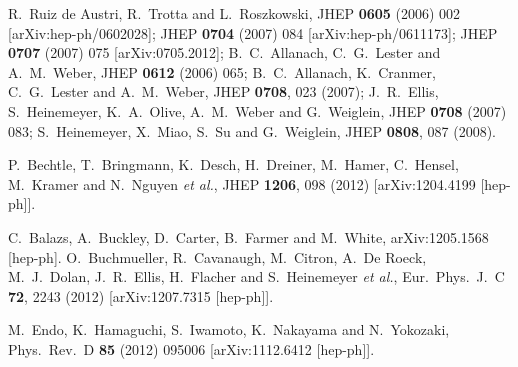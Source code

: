 \begin{thebibliography}{99}
R.~Ruiz de Austri, R.~Trotta and L.~Roszkowski,
JHEP \textbf{0605} (2006) 002 [arXiv:hep-ph/0602028];
JHEP \textbf{0704} (2007) 084 [arXiv:hep-ph/0611173];
%
JHEP \textbf{0707} (2007) 075 [arXiv:0705.2012];
B.~C.~Allanach, C.~G.~Lester and A.~M.~Weber,
JHEP \textbf{0612} (2006) 065;
B.~C.~Allanach, K.~Cranmer, C.~G.~Lester and A.~M.~Weber,
 JHEP {\bf 0708}, 023 (2007);
J.~R.~Ellis, S.~Heinemeyer, K.~A.~Olive, A.~M.~Weber and
G.~Weiglein,
  JHEP {\bf 0708} (2007) 083; %
  S.~Heinemeyer, X.~Miao, S.~Su and G.~Weiglein,
 JHEP {\bf 0808}, 087 (2008).


  P.~Bechtle, T.~Bringmann, K.~Desch, H.~Dreiner, M.~Hamer, C.~Hensel, M.~Kramer and N.~Nguyen {\it et al.},
  JHEP {\bf 1206}, 098 (2012)
  [arXiv:1204.4199 [hep-ph]].

  C.~Balazs, A.~Buckley, D.~Carter, B.~Farmer and M.~White,
  arXiv:1205.1568 [hep-ph].
  O.~Buchmueller, R.~Cavanaugh, M.~Citron, A.~De Roeck, M.~J.~Dolan, J.~R.~Ellis, H.~Flacher and S.~Heinemeyer {\it et al.},
  Eur.\ Phys.\ J.\ C {\bf 72}, 2243 (2012)
  [arXiv:1207.7315 [hep-ph]].


  M.~Endo, K.~Hamaguchi, S.~Iwamoto, K.~Nakayama and N.~Yokozaki,
  Phys.\ Rev.\ D {\bf 85} (2012) 095006
  [arXiv:1112.6412 [hep-ph]].


\end{thebibliography}
